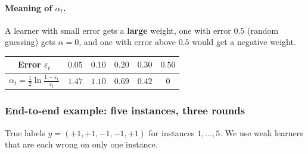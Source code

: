 \paragraph{Meaning of $\alpha_t$.} A learner with small error gets a \textbf{large} weight, one with error $0.5$ (random guessing) gets $\alpha=0$, and one with error above $0.5$ would get a negative weight.

\medskip
\begin{center}
\begin{tabular}{@{}c|ccccc@{}}
\toprule
Error $\varepsilon_t$ & $0.05$ & $0.10$ & $0.20$ & $0.30$ & $0.50$\\
\midrule
$\alpha_t=\frac12\ln\frac{1-\varepsilon_t}{\varepsilon_t}$ & $1.47$ & $1.10$ & $0.69$ & $0.42$ & $0$\\
\bottomrule
\end{tabular}
\end{center}

\subsubsection*{End-to-end example: five instances, three rounds}

True labels $y=(+1,+1,-1,-1,+1)$ for instances $1,\dots,5$. We use weak learners that are each wrong on only one instance.

